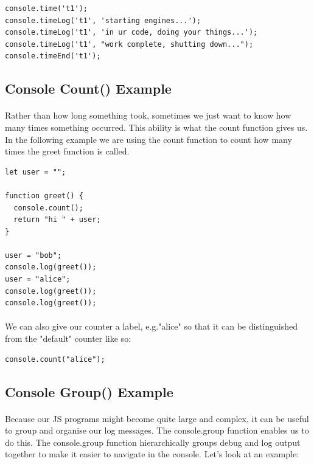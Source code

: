 \begin{lstlisting}
console.time('t1');
console.timeLog('t1', 'starting engines...');
console.timeLog('t1', 'in ur code, doing your things...');
console.timeLog('t1', "work complete, shutting down...");
console.timeEnd('t1');
\end{lstlisting}



\subsection{Console Count() Example}
\paragraph{} Rather than how long something took, sometimes we just want to know how many times something occurred. This ability is what the count function gives us. In the following example we are using the count function to count how many times the greet function is called.

\begin{lstlisting}
let user = "";

function greet() {
  console.count();
  return "hi " + user;
}

user = "bob";
console.log(greet());
user = "alice";
console.log(greet());
console.log(greet());
\end{lstlisting}

\paragraph{} We can also give our counter a label, e.g."alice" so that it can be distinguished from the "default" counter like so:

\begin{lstlisting}
console.count("alice");
\end{lstlisting}



\subsection{Console Group() Example}
\paragraph{} Because our JS programs might become quite large and complex, it can be useful to group and organise our log messages. The console.group function enables us to do this. The console.group function hierarchically groups debug and log output together to make it easier to navigate in the console. Let's look at an example:

